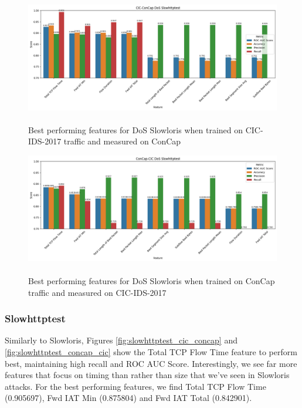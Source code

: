 \begin{figure}
	\centering
	\includegraphics[width=1.2\linewidth]{images/slowhttptest_cic_concap}
	\caption{\\Best performing features for DoS Slowloris when trained on CIC-IDS-2017 traffic and measured on ConCap}
	\label{fig:slowloris_cic_concap}
\end{figure}
\begin{figure}
	\centering
	\includegraphics[width=1.2\linewidth]{images/slowhttptest_concap_cic}
	\caption{\\Best performing features for DoS Slowloris when trained on ConCap traffic and measured on CIC-IDS-2017}
	\label{fig:slowloris_concap_cic}
\end{figure}


\subsubsection{Slowhttptest}
Similarly to Slowloris, Figures \ref{fig:slowhttptest_cic_concap} and \ref{fig:slowhttptest_concap_cic} show the Total TCP Flow Time feature to perform best, maintaining high recall and ROC AUC Score. Interestingly, we see far more features that focus on timing than rather than size that we've seen in Slowloris attacks. For the best performing features, we find Total TCP Flow Time (0.905697), Fwd IAT Min (0.875804) and Fwd IAT Total (0.842901).

